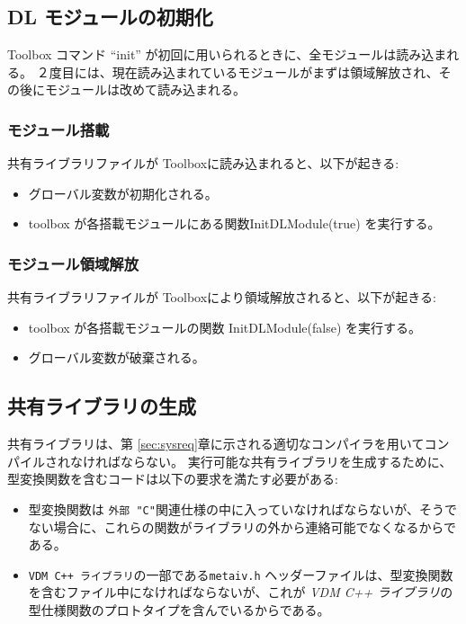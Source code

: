 \documentclass[\pformat,12pt]{jarticle}
\begin{document}
\subsection{DL モジュールの初期化}
\label{sec:init}

Toolbox コマンド ``init'' が初回に用いられるときに、全モジュールは読み込まれる。
２度目には、現在読み込まれているモジュールがまずは領域解放され、その後にモジュールは改めて読み込まれる。

\subsubsection{モジュール搭載}
共有ライブラリファイルが Toolboxに読み込まれると、以下が起きる:  
\begin{itemize}
\item グローバル変数が初期化される。
\item  toolbox が各搭載モジュールにある関数InitDLModule(true) を実行する。 
\end{itemize}

\subsubsection{モジュール領域解放}
共有ライブラリファイルが Toolboxにより領域解放されると、以下が起きる:
\begin{itemize}
\item toolbox が各搭載モジュールの関数 InitDLModule(false) を実行する。
\item グローバル変数が破棄される。
\end{itemize}


\subsection{共有ライブラリの生成}\label{sec:create}

共有ライブラリは、第 \ref{sec:sysreq}章に示される適切なコンパイラを用いてコンパイルされなければならない。
実行可能な共有ライブラリを生成するために、型変換関数を含むコードは以下の要求を満たす必要がある:
\begin{itemize}
\item 型変換関数は {\tt 外部 "C"}関連仕様の中に入っていなければならないが、そうでない場合に、これらの関数がライブラリの外から連絡可能でなくなるからである。
\item   {\tt VDM C++ ライブラリ}の一部である{\tt metaiv.h} ヘッダーファイルは、型変換関数を含むファイル中になければならないが、これが {\it VDM C++ ライブラリ}の型仕様関数のプロトタイプを含んでいるからである。
\end{itemize}
\end{document}
